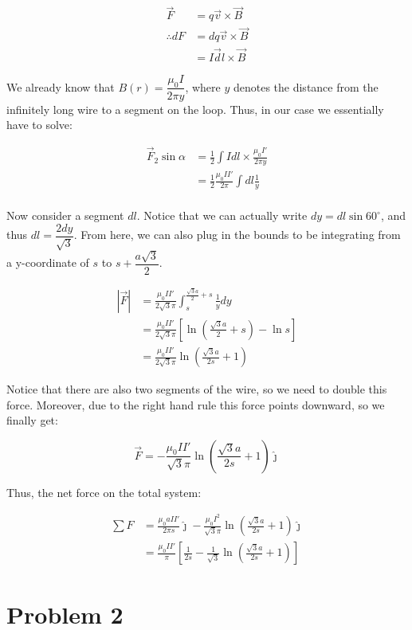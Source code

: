 \documentclass{article}
\theoremstyle{definition}
\numberwithin{equation}{section}
\numberwithin{definition}{section}
\begin{document}
\begin{align*}
  \vec F &= q \vec v \times \vec B \\
  \therefore dF &= dq \vec v \times \vec B\\
  &= I \vec dl \times \vec B
\end{align*}

We already know that $B(r) = \dfrac{\mu_0 I}{2\pi y}$, where $y$ denotes the distance from the infinitely long wire to a segment on the loop. Thus, in our case we essentially have to solve:

\begin{align*}
  \vec F_2 \sin \alpha &= \frac{1}{2} \int I dl \times \frac{\mu_0 I'}{2\pi y}\\
  &= \frac{1}{2} \frac{\mu_0 II'}{2\pi}\int dl \frac{1}{y}\\
\end{align*}

Now consider a segment $dl$. Notice that we can actually write $dy = dl \sin 60^\circ$, and thus $dl = \dfrac{2dy}{\sqrt{3}}$. From here, we can also plug in the bounds to be integrating from a y-coordinate of $s$ to $s + \dfrac{a\sqrt{3}}{2}$.

\begin{align*}
  |\vec{F}| &= \frac{\mu_0 II'}{2\sqrt{3}\pi} \int_s^{\frac{\sqrt{3}a}{2} + s} \frac{1}{y} dy\\
  &= \frac{\mu_0 II'}{2\sqrt{3}\pi} \left[\ln\left(\frac{\sqrt{3}a}{2} + s\right) - \ln s\right]\\
  &= \frac{\mu_0 II'}{2\sqrt{3}\pi} \ln \left(\frac{\sqrt{3}a}{2s} + 1\right)
\end{align*}

Notice that there are also two segments of the wire, so we need to double this force. Moreover, due to the right hand rule this force points downward, so we finally get:

\[ \vec{F} = -\frac{\mu_0 II'}{\sqrt{3}\pi}\ln\left(\frac{\sqrt 3 a}{2s} + 1\right) \hat \jmath\]

Thus, the net force on the total system:

\begin{align*}
  \sum F &= \frac{\mu_0 aII'}{2\pi s}\hat \jmath - \frac{\mu_0 I^2}{\sqrt{3}\pi}\ln\left(\frac{\sqrt 3 a}{2s}+ 1\right) \hat \jmath\\
  &=\frac{\mu_0 I I'}{\pi}\left[\frac{1}{2s} - \frac{1}{\sqrt{3}}\ln\left(\frac{\sqrt{3}a}{2s}+ 1\right)\right]
\end{align*}

\section{Problem 2}
\end{document}
